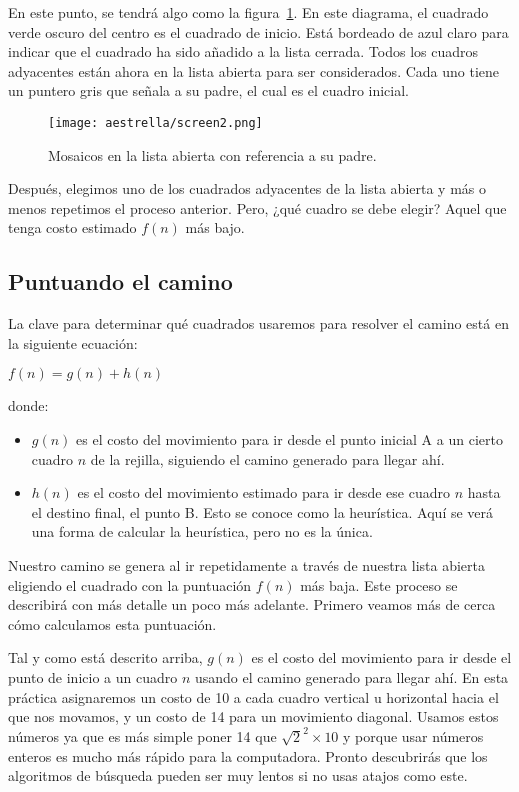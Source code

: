 En este punto, se tendrá algo como la figura~\ref{fig:fig2P4}. En este diagrama, el cuadrado verde oscuro del centro es el cuadrado de inicio. Está bordeado de azul claro para indicar que el cuadrado ha sido añadido a la lista cerrada. Todos los cuadros adyacentes están ahora en la lista abierta para ser considerados. Cada uno tiene un puntero gris que señala a su padre, el cual es el cuadro inicial.

\begin{figure}[h]
  \centering
  \texttt{[image: aestrella/screen2.png]}
  \caption{Mosaicos en la lista abierta con referencia a su padre.}
  \label{fig:fig2P4}
\end{figure}


Después, elegimos uno de los cuadrados adyacentes de la lista abierta y más o menos repetimos el proceso anterior. Pero, ¿qué cuadro se debe elegir? Aquel que tenga costo estimado \(f(n)\) más bajo.

\subsection{Puntuando el camino}

La clave para determinar qué cuadrados usaremos para resolver el camino está en la siguiente ecuación:\medskip

\begin{center}
\(f(n) = g(n) + h(n)\)
\end{center}\medskip

donde:

\begin{itemize}
  \item \(g(n)\) es el costo del movimiento para ir desde el punto inicial A a un cierto cuadro \(n\) de la rejilla, siguiendo el camino generado para llegar ahí.
  \item \(h(n)\) es el costo del movimiento estimado para ir desde ese cuadro \(n\) hasta el destino final, el punto B. Esto se conoce como la heurística. Aquí se verá una forma de calcular la heurística, pero no es la única.
\end{itemize}

Nuestro camino se genera al ir repetidamente a través de nuestra lista abierta eligiendo el cuadrado con la puntuación \(f(n)\) más baja. Este proceso se describirá con más detalle un poco más adelante. Primero veamos más de cerca cómo calculamos esta puntuación.

Tal y como está descrito arriba, \(g(n)\) es el costo del movimiento para ir desde el punto de inicio a un cuadro \(n\) usando el camino generado para llegar ahí. En esta práctica asignaremos un costo de 10 a cada cuadro vertical u horizontal hacia el que nos movamos, y un costo de 14 para un movimiento diagonal. Usamos estos números ya que es más simple poner 14 que \(\sqrt{2}^2\times10\) y porque usar números enteros es mucho más rápido para la computadora. Pronto descubrirás que los algoritmos de búsqueda pueden ser muy lentos si no usas atajos como este.

